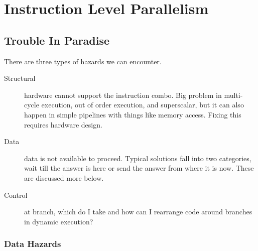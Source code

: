 \chapter{Instruction Level Parallelism}
\label{c-ilp}



\section{Trouble In Paradise}

There are three types of hazards we can encounter.

\begin{description}
    \item[Structural] hardware cannot support the instruction combo.  Big problem in multi-cycle execution, out of order execution, and superscalar, but it can also happen in simple pipelines with things like memory access.  Fixing this requires hardware design.
    \item[Data]       data is not available to proceed.  Typical solutions fall into two categories, wait till the answer is here or send the answer from where it is now.  These are discussed more below.
    \item[Control]    at branch, which do I take and how can I rearrange code around branches in dynamic execution?
\end{description}


\subsection{Data Hazards}

